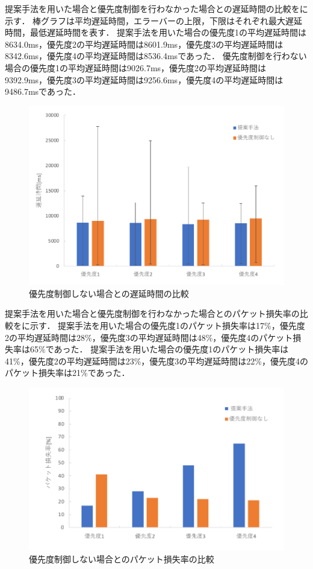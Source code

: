 \documentclass[a4paper,11pt,uplatex]{ujreport}
\begin{document}
  提案手法を用いた場合と優先度制御を行わなかった場合との遅延時間の比較をに示す．
  棒グラフは平均遅延時間，エラーバーの上限，下限はそれぞれ最大遅延時間，最低遅延時間を表す．
  提案手法を用いた場合の優先度1の平均遅延時間は8634.0ms，優先度2の平均遅延時間は8601.9ms，優先度3の平均遅延時間は8342.6ms，優先度4の平均遅延時間は8536.4msであった．
  優先度制御を行わない場合の優先度1の平均遅延時間は9026.7ms，優先度2の平均遅延時間は9392.9ms，優先度3の平均遅延時間は9256.6ms，優先度4の平均遅延時間は9486.7msであった．

  \begin{figure}[!b]
    \centering
    \includegraphics[width=0.85\linewidth]{img/RTT_1.pdf}
    \caption{優先度制御しない場合との遅延時間の比較}
    \label{fig:RTT_1}
  \end{figure}

  提案手法を用いた場合と優先度制御を行わなかった場合とのパケット損失率の比較をに示す．
  提案手法を用いた場合の優先度1のパケット損失率は17\%，優先度2の平均遅延時間は28\%，優先度3の平均遅延時間は48\%，優先度4のパケット損失率は65\%であった．
  提案手法を用いた場合の優先度1のパケット損失率は41\%，優先度2の平均遅延時間は23\%，優先度3の平均遅延時間は22\%，優先度4のパケット損失率は21\%であった．

  \begin{figure}[!b]
    \centering
    \includegraphics[width=0.85\linewidth]{img/packetloss_1.pdf}
    \caption{優先度制御しない場合とのパケット損失率の比較}
    \label{fig:packetloss_1}
  \end{figure}
\end{document}
